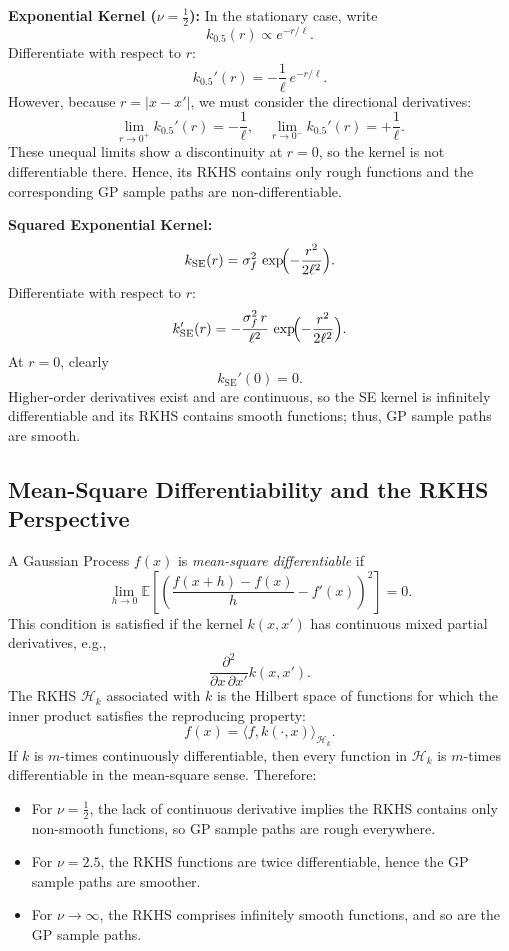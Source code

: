 \documentclass[11pt]{article}
\begin{document}
\textbf{Exponential Kernel ($\nu=\frac{1}{2}$):}
In the stationary case, write
\[
k_{0.5}(r)\propto e^{-r/\ell}.
\]
Differentiate with respect to $r$:
\[
k_{0.5}'(r)=-\frac{1}{\ell}\,e^{-r/\ell}.
\]
However, because $r=|x-x'|$, we must consider the directional derivatives:
\[
\lim_{r\to0^+} k_{0.5}'(r)=-\frac{1}{\ell},\quad \lim_{r\to0^-} k_{0.5}'(r)=+\frac{1}{\ell}.
\]
These unequal limits show a discontinuity at $r=0$, so the kernel is not differentiable there. Hence, its RKHS contains only rough functions and the corresponding GP sample paths are non-differentiable.

\medskip

\textbf{Squared Exponential Kernel:}
\[
k_{\text{SE}}(r)=\sigma_f^2\,\exp\!\Bigl({-\frac{r^2}{2\ell^2}}\Bigr).
\]
Differentiate with respect to $r$:
\[
k_{\text{SE}}'(r)=-\frac{\sigma_f^2\,r}{\ell^2}\,\exp\!\Bigl({-\frac{r^2}{2\ell^2}}\Bigr).
\]
At $r=0$, clearly
\[
k_{\text{SE}}'(0)=0.
\]
Higher-order derivatives exist and are continuous, so the SE kernel is infinitely differentiable and its RKHS contains smooth functions; thus, GP sample paths are smooth.

\medskip

\subsection*{Mean-Square Differentiability and the RKHS Perspective}

A Gaussian Process $f(x)$ is \emph{mean-square differentiable} if
\[
\lim_{h\to0}\mathbb{E}\left[\left(\frac{f(x+h)-f(x)}{h}-f'(x)\right)^2\right]=0.
\]
This condition is satisfied if the kernel $k(x,x')$ has continuous mixed partial derivatives, e.g.,
\[
\frac{\partial^2}{\partial x\,\partial x'}k(x,x').
\]
The RKHS $\mathcal{H}_k$ associated with $k$ is the Hilbert space of functions for which the inner product satisfies the reproducing property:
\[
f(x)=\langle f, k(\cdot,x) \rangle_{\mathcal{H}_k}.
\]
If $k$ is $m$-times continuously differentiable, then every function in $\mathcal{H}_k$ is $m$-times differentiable in the mean-square sense. Therefore:
\begin{itemize}
    \item For $\nu=\frac{1}{2}$, the lack of continuous derivative implies the RKHS contains only non-smooth functions, so GP sample paths are rough everywhere.
    \item For $\nu=2.5$, the RKHS functions are twice differentiable, hence the GP sample paths are smoother.
    \item For $\nu\to\infty$, the RKHS comprises infinitely smooth functions, and so are the GP sample paths.
\end{itemize}
\end{document}
